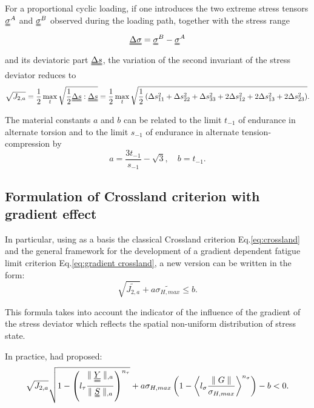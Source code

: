For a proportional cyclic loading, if one introduces the two extreme stress tensors $\uuline{\sigma}^A$ and $\uuline{\sigma}^B$ observed during the loading path, together with the stress range 
\begin{equation}\uuline{\Delta\sigma}=\uuline{\sigma}^B-\uuline{\sigma}^A\end{equation}
and its deviatoric part $\uuline{\Delta s} $, the variation of
the second invariant of the stress deviator reduces to 
\begin{equation}\sqrt{J_{2,a}}=\dfrac{1}{2}\max\limits_{t}\sqrt{\dfrac{1}{2}\uuline{\Delta s}:\uuline{\Delta s}}=\dfrac{1}{2}\max\limits_{t}\sqrt{\dfrac{1}{2}\left( \Delta s_{11}^2+\Delta s_{22}^2+\Delta s_{33}^2+2\Delta s_{12}^2+2\Delta s_{13}^2+2\Delta s_{23}^2\right) }.\end{equation}



The material constants $a$ and $b$ can be related to  the limit $t_{-1}$ of endurance in alternate torsion and to the limit $s_{-1}$ of endurance in alternate tension-compression by
\begin{equation}
	a=\dfrac{3 t_{-1}}{s_{-1}}-\sqrt{3},\quad 
	b=t_{-1}.
	\label{crossland-ab}
\end{equation}

\subsection{Formulation of Crossland criterion with gradient effect}

In particular, using as a basis the classical Crossland criterion Eq.\eqref{eq:crossland} and the general framework for the development of a gradient dependent fatigue limit criterion Eq.\eqref{eq:gradient crossland}, a new version can be written in the form:
\begin{equation}
	\sqrt{\widetilde{J_{2,a}}}+a\widetilde{\sigma_{H,max}}\leqslant b .
\end{equation}

This formula takes into account the indicator of the influence of the gradient of the stress deviator which reflects the spatial non-uniform distribution of stress state.

In practice, \cite{luu2014formulation} had proposed:
\begin{equation}
	\sqrt{{J_{2,a}}}\sqrt{1-\left(l_\tau\dfrac{\parallel \uuline{\uline{Y}}\parallel_{,a}}{\parallel \uuline{S}\parallel_{,a}}\right)^{n_\tau}}+a\sigma_{H,max}\left(1-\left\langle  l_\sigma\dfrac{\parallel G\parallel}{\sigma_{H,max}}\right\rangle ^{n_\sigma}\right)-b < 0 .
\end{equation}

